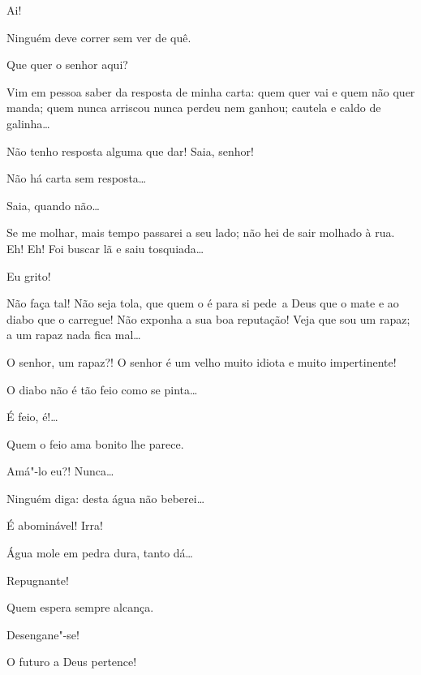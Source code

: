 

  Ai!

   Ninguém deve correr sem ver
de quê.

  Que quer o senhor aqui?

  Vim em pessoa saber da resposta de minha carta: quem quer vai e
quem não quer manda; quem nunca arriscou nunca perdeu nem ganhou; cautela e
caldo de galinha\ldots{}

  Não tenho resposta alguma que dar!
Saia, senhor!

  Não há carta sem resposta\ldots{}

  Saia,
quando não\ldots{}

   Se me molhar, mais tempo passarei a seu
lado; não hei de sair molhado à rua. Eh! Eh! Foi buscar lã e saiu
tosquiada\ldots{}

  Eu grito!

  Não faça tal! Não seja tola, que quem o é para si \mbox{pede a} Deus
que o mate e ao diabo que o carregue! Não exponha a sua boa reputação! Veja que
sou um rapaz; a um rapaz nada fica mal\ldots{}

  O senhor, um rapaz?! O senhor é um velho muito idiota e muito
impertinente!

  O diabo não é tão feio como se pinta\ldots{}

  É feio, é!\ldots{}

  Quem o feio ama bonito lhe parece.

  Amá"-lo eu?! Nunca\ldots{}

  Ninguém diga: desta água não beberei\ldots{}

  É abominável! Irra!

  Água mole em pedra dura, tanto dá\ldots{}

  Repugnante!

  Quem espera sempre alcança.

  Desengane"-se!

  O futuro a Deus pertence!

